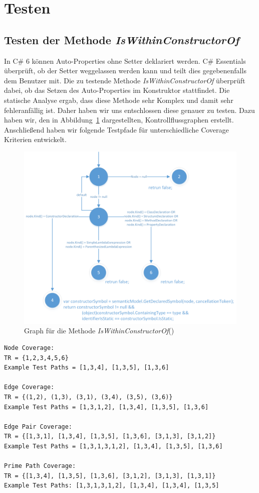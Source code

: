 %
\section{Testen}

\subsection{Testen der Methode \textit{IsWithinConstructorOf}}
In C\# 6 können Auto-Properties ohne Setter deklariert werden.\cite{csharp6} C\# Essentials überprüft, ob der Setter weggelassen werden kann und teilt dies gegebenenfalls dem Benutzer mit. Die zu testende Methode \textit{IsWithinConstructorOf} überprüft dabei, ob das Setzen des Auto-Properties im Konstruktor stattfindet. Die statische Analyse ergab, dass diese Methode sehr Komplex und damit sehr fehleranfällig ist. Daher haben wir uns entschlossen diese genauer zu testen. Dazu haben wir, den in Abbildung~\ref{fig:graph-constructor} dargestellten, Kontrollflussgraphen erstellt. Anschließend haben wir folgende Testpfade für unterschiedliche Coverage Kriterien entwickelt.\\
\begin{figure}
	\centering
	\includegraphics[width=\textwidth]{images/GraphIsWithinConstructorOf.png}
	\caption{Graph für die Methode \textit{IsWithinConstructorOf}()}
	\label{fig:graph-constructor}
\end{figure}
\begin{lstlisting}
Node Coverage:
TR = {1,2,3,4,5,6}
Example Test Paths = [1,3,4], [1,3,5], [1,3,6]

Edge Coverage:
TR = {(1,2), (1,3), (3,1), (3,4), (3,5), (3,6)}
Example Test Paths = [1,3,1,2], [1,3,4], [1,3,5], [1,3,6]

Edge Pair Coverage:
TR = {[1,3,1], [1,3,4], [1,3,5], [1,3,6], [3,1,3], [3,1,2]}
Example Test Paths = [1,3,1,3,1,2], [1,3,4], [1,3,5], [1,3,6]

Prime Path Coverage:
TR = {[1,3,4], [1,3,5], [1,3,6], [3,1,2], [3,1,3], [1,3,1]}
Example Test Paths: [1,3,1,3,1,2], [1,3,4], [1,3,4], [1,3,5]

\end{lstlisting}
